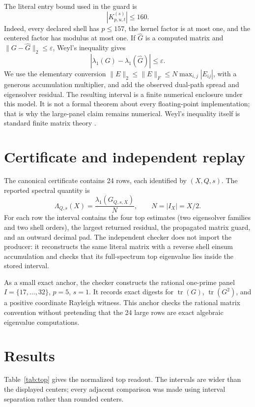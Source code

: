 \documentclass[10pt]{article}
\newcommand{\tr}{\operatorname{tr}}
\begin{document}
The literal entry bound used in the guard is
\[
 |K_{p,u,t}^{(s)}|\leq160.
 \label{eq:entrybound}
\]
Indeed, every declared shell has $p\leq157$, the kernel factor is at most one,
and the centered factor has modulus at most one.  If $\widehat G$ is a computed
matrix and $\|G-\widehat G\|_2\leq\varepsilon$, Weyl's inequality gives
\begin{equation}
 |\lambda_1(G)-\lambda_1(\widehat G)|\leq\varepsilon.
 \label{eq:weyl}
\end{equation}
We use the elementary conversion
$\|E\|_2\leq\|E\|_F\leq N\max_{i,j}|E_{ij}|$, with a generous accumulation
multiplier, and add the observed dual-path spread and eigensolver residual.
The resulting interval is a finite numerical enclosure under this model.  It
is not a formal theorem about every floating-point implementation; that is why
the large-panel claim remains numerical.  Weyl's inequality itself is standard
finite matrix theory \cite{weyl,hj}.

\section{Certificate and independent replay}

The canonical certificate contains 24 rows, each identified by $(X,Q,s)$.
The reported spectral quantity is
\[
 \Lambda_{Q,s}(X)=\frac{\lambda_1(G_{Q,s,X})}{N},
 \qquad N=|I_X|=X/2.
 \label{eq:normalized}
\]
For each row the interval contains the four top estimates (two eigensolver
families and two shell orders), the largest returned residual, the propagated
matrix guard, and an outward decimal pad.  The independent checker does not
import the producer: it reconstructs the same literal matrix with a reverse
shell einsum accumulation and checks that its full-spectrum top eigenvalue lies
inside the stored interval.

As a small exact anchor, the checker constructs the rational one-prime panel
$I=\{17,\ldots,32\}$, $p=5$, $s=1$.  It records exact digests for
$\tr(G)$, $\tr(G^2)$, and a positive coordinate Rayleigh witness.  This anchor
checks the rational matrix convention without pretending that the 24 large
rows are exact algebraic eigenvalue computations.

\section{Results}

Table~\ref{tab:top} gives the normalized top readout.  The intervals are wider
than the displayed centers; every adjacent comparison was made using interval
separation rather than rounded centers.
\end{document}
